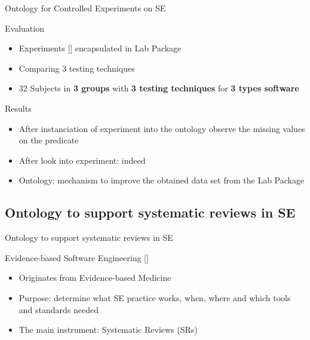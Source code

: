 \documentclass[16:9,en,navbarside]{sdqbeamer}
\begin{document}
\begin{frame}{Ontology for Controlled Experiments on SE}
\begin{block}{Evaluation}
    \begin{itemize}
        \item Experiments [\cite{Bas87}] encapsulated in Lab Package 
        \item Comparing 3 testing techniques 
        \item 32 Subjects in \textbf{3 groups} with \textbf{3 testing techniques} for \textbf{3 types software}
    \end{itemize}
\end{block}
\pause
\begin{block}{Results}
    \begin{itemize}
        \item After instanciation of experiment into the ontology observe the missing values on the predicate
        \pause
        \item After look into experiment: indeed
        \pause
        \item Ontology: mechanism to improve the obtained data set from the Lab Package
    \end{itemize}
\end{block}
\end{frame}


\subsection{Ontology to support systematic reviews in SE}
\begin{frame}{Ontology to support systematic reviews in SE}
\pause
\begin{block}{Evidence-based Software Engineering [\cite{Kit04}]}
\begin{itemize}
   	\item Originates from Evidence-based Medicine
   	\pause
   	\item Purpose: determine what SE practice works, when, where and which tools
and standards needed
    \pause
    \item The main instrument: Systematic Reviews (SRs)
\end{itemize}
\end{block}
\end{frame}
\end{document}
